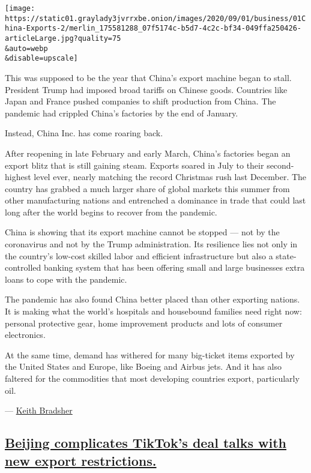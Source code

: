 \texttt{[image: https://static01.graylady3jvrrxbe.onion/images/2020/09/01/business/01China-Exports-2/merlin\_175581288\_07f5174c-b5d7-4c2c-bf34-049ffa250426-articleLarge.jpg?quality=75\\\&auto=webp\\\&disable=upscale]}

This was supposed to be the year that China's export machine began to
stall. President Trump had imposed broad tariffs on Chinese goods.
Countries like Japan and France pushed companies to shift production
from China. The pandemic had crippled China's factories by the end of
January.

Instead, China Inc. has come roaring back.

After reopening in late February and early March, China's factories
began an export blitz that is still gaining steam. Exports soared in
July to their second-highest level ever, nearly matching the record
Christmas rush last December. The country has grabbed a much larger
share of global markets this summer from other manufacturing nations and
entrenched a dominance in trade that could last long after the world
begins to recover from the pandemic.

China is showing that its export machine cannot be stopped --- not by
the coronavirus and not by the Trump administration. Its resilience lies
not only in the country's low-cost skilled labor and efficient
infrastructure but also a state-controlled banking system that has been
offering small and large businesses extra loans to cope with the
pandemic.

The pandemic has also found China better placed than other exporting
nations. It is making what the world's hospitals and housebound families
need right now: personal protective gear, home improvement products and
lots of consumer electronics.

At the same time, demand has withered for many big-ticket items exported
by the United States and Europe, like Boeing and Airbus jets. And it has
also faltered for the commodities that most developing countries export,
particularly oil.

--- \href{https://www.nytimes3xbfgragh.onion/by/keith-bradsher}{Keith
Bradsher}

\hypertarget{beijing-complicates-tiktoks-deal-talks-with-new-export-restrictions}{%
\subsection{\texorpdfstring{\protect\hyperlink{beijing-complicates-tiktoks-deal-talks-with-new-export-restrictions}{Beijing
complicates TikTok's deal talks with new export
restrictions.}}{Beijing complicates TikTok's deal talks with new export restrictions.}}\label{beijing-complicates-tiktoks-deal-talks-with-new-export-restrictions}}

